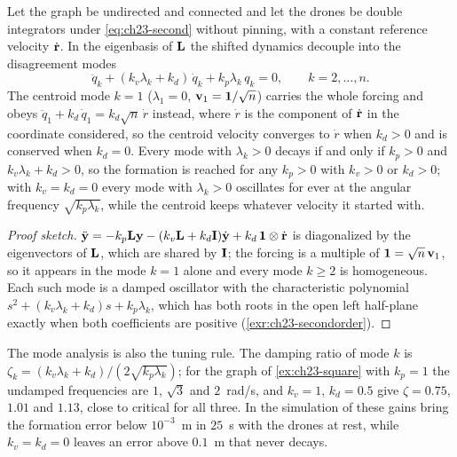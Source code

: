 \begin{proposition}
\label{prop:ch23-second}
Let the graph be undirected and connected and let the drones be double
integrators under \cref{eq:ch23-second} without pinning, with a constant
reference velocity $\dot{\mathbf{r}}$. In the eigenbasis of $\mathbf{L}$ the
shifted dynamics decouple into the disagreement modes
\begin{equation}
  \ddot{q}_k + (k_v\lambda_k + k_d)\,\dot{q}_k + k_p\lambda_k\, q_k = 0,
  \qquad k = 2, \dots, n .
  \label{eq:ch23-modes2}
\end{equation}
The centroid mode $k = 1$ ($\lambda_1 = 0$, $\mathbf{v}_1 = \mathbf{1}/\sqrt{n}$)
carries the whole forcing and obeys $\ddot{q}_1 + k_d\,\dot{q}_1 =
k_d\sqrt{n}\,\dot{r}$ instead, where $\dot{r}$ is the component of
$\dot{\mathbf{r}}$ in the coordinate considered, so the centroid velocity
converges to $\dot{r}$ when $k_d > 0$ and is conserved when $k_d = 0$.
Every mode with $\lambda_k > 0$ decays if and only if $k_p > 0$ and $k_v\lambda_k
+ k_d > 0$, so the formation is reached for any $k_p > 0$ with $k_v > 0$ or
$k_d > 0$; with $k_v = k_d = 0$ every mode with $\lambda_k > 0$ oscillates for
ever at the angular frequency $\sqrt{k_p\lambda_k}$, while the centroid keeps
whatever velocity it started with.
\end{proposition}
\begin{proof}[Proof sketch]
$\ddot{\mathbf{y}} = -k_p\mathbf{L}\mathbf{y} - (k_v\mathbf{L} + k_d\mathbf{I})\dot{\mathbf{y}}
+ k_d\,\mathbf{1}\otimes\dot{\mathbf{r}}$
is diagonalized by the eigenvectors of $\mathbf{L}$, which are shared by
$\mathbf{I}$; the forcing is a multiple of $\mathbf{1} = \sqrt{n}\,\mathbf{v}_1$, so
it appears in the mode $k = 1$ alone and every mode $k \ge 2$ is homogeneous.
Each such mode is a damped oscillator with the characteristic polynomial
$s^2 + (k_v\lambda_k + k_d)s + k_p\lambda_k$, which has both roots in the open
left half-plane exactly when both coefficients are positive
(\cref{exr:ch23-secondorder}).
\end{proof}

The mode analysis is also the tuning rule. The damping ratio of mode $k$ is
$\zeta_k = (k_v\lambda_k + k_d)/(2\sqrt{k_p\lambda_k})$; for the graph of
\cref{ex:ch23-square} with $k_p = 1$ the undamped frequencies are $1$,
$\sqrt3$ and $2$~rad/s, and $k_v = 1$, $k_d = 0.5$ give $\zeta = 0.75$,
$1.01$ and $1.13$, close to critical for all three. In the simulation of
 these gains bring the formation error below
$10^{-3}$~m in $25$~s with the drones at rest, while $k_v = k_d = 0$ leaves an
error above $0.1$~m that never decays.

